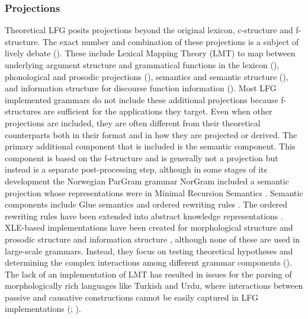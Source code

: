 \documentclass[output=paper,hidelinks]{langscibook}
\begin{document}
\subsubsection{Projections} Theoretical LFG posits  projections beyond the original lexicon, c-structure and f-structure. The exact number and combination of these projections is a subject of lively debate (). These include Lexical Mapping Theory (LMT) to map between underlying argument structure and grammatical functions in the lexicon (), phonological and prosodic projections (), semantics and semantic structure (), and information structure for discourse function information (). Most LFG implemented grammars do not include these additional projections because f-structures are sufficient for the applications they target. Even when other projections are included, they are often different from their theoretical counterparts both in their format and in how they are projected or derived. The primary additional component that is  included is the semantic component.  This component is based on the f-structure and is generally not a projection but instead is a separate post-processing step, although in some stages of its development the Norwegian ParGram grammar NorGram \citep{dyvikEtAl2016,dyvikEtAl2019} included a semantic projection \citep{halvorsen83,kaplan1987three,halvorsenKaplan95} whose representations were in Minimal Recursion Semantics \citep{copestakeetal05}. Semantic components include Glue semantics \citep{dalrympleetal93,messmerzylma18} and ordered rewriting rules \citep{crouchking06}. The ordered rewriting rules have been extended into abstract knowledge representations \citep{bobrowetal07}. XLE-based implementations have been created for morphological structure \citep{buttetal96} and prosodic structure  and information structure \citep{buttking98}, although none of these are used in  large-scale grammars. Instead, they focus on testing theoretical hypotheses and determining the complex interactions among different grammar components (). The lack of an implementation of LMT has resulted in issues for the parsing of morphologically rich languages like Turkish and Urdu, where interactions between 
passive and causative constructions cannot be easily captured in LFG implementations (; \cite{cetinogluetal08}). 
\end{document}
